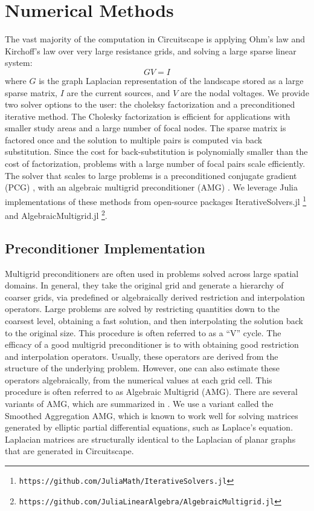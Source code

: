 \documentclass{juliacon}
\begin{document}
\section{Numerical Methods}
The vast majority of the computation in Circuitscape is applying Ohm’s law and Kirchoff’s law over very large resistance grids, and solving a large sparse linear system: 
$$
GV = I
$$
where $G$ is the graph Laplacian representation of the landscape stored as a large sparse matrix, $I$ are the current sources, and $V$ are the nodal voltages. We provide two solver options to the user: the choleksy factorization and a preconditioned iterative method. The Cholesky factorization \cite{higham2009cholesky} is efficient for applications with smaller study areas and a large number of focal nodes. The sparse matrix is factored once and the solution to multiple pairs is computed via back substitution. Since the cost for back-substitution is polynomially smaller than the cost of factorization, problems with a large number of focal pairs scale efficiently. The solver that scales to large problems is a preconditioned conjugate gradient (PCG) \cite{trefethen1997numerical}, with an algebraic multigrid preconditioner (AMG) \cite{vanvek1996algebraic}. We leverage Julia implementations of these methods from open-source packages IterativeSolvers.jl \footnote{\texttt{https://github.com/JuliaMath/IterativeSolvers.jl}} and AlgebraicMultigrid.jl \footnote{\texttt{https://github.com/JuliaLinearAlgebra/AlgebraicMultigrid.jl}}.

\subsection{Preconditioner Implementation}
Multigrid preconditioners are often used in problems solved across large spatial domains. In general, they take the original grid and generate a hierarchy of coarser grids, via predefined or algebraically derived restriction and interpolation operators. Large problems are solved by restricting quantities down to the coarsest level, obtaining a fast solution, and then interpolating the solution back to the original size. This procedure is often referred to as a “V” cycle. The efficacy of a good multigrid preconditioner is to with obtaining good restriction and interpolation operators. Usually, these operators are derived from the structure of the underlying problem. However, one can also estimate these operators algebraically, from the numerical values at each grid cell. This procedure is often referred to as Algebraic Multigrid (AMG). There are several variants of AMG, which are summarized in \cite{stuben2001review}. We use a variant called the Smoothed Aggregation AMG, which is known to work well for solving matrices generated by elliptic partial differential equations, such as Laplace’s equation. Laplacian matrices are structurally identical to the Laplacian of planar graphs that are generated in Circuitscape.
\end{document}
